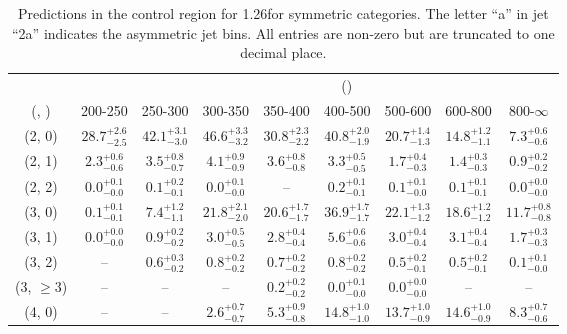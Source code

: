 \begin{table}[h!]
\tiny
\centering
\caption{Predictions in the \mmj control region for 1.26\ifb for symmetric categories. The letter ``a'' in jet \eg ``2a''  indicates the asymmetric jet bins. All entries are non-zero but are truncated to one decimal place.\label{tab:predsep_ewk_mumu_sym}}
\begin{tabular}
{ccccccccc}
	\hline\hline
&	& \multicolumn{8}{c}{\scalht (\gev)} \\ 
	 (\njet,  \nb) & 200-250 & 250-300 & 300-350 & 350-400 & 400-500 & 500-600 & 600-800 & 800-$\infty$ \\ [0.8ex] 
\hline
	(2, 0) & $28.7^{+ 2.6 }_{- 2.5 }$ & $42.1^{+ 3.1 }_{- 3.0 }$ & $46.6^{+ 3.3 }_{- 3.2 }$ & $30.8^{+ 2.3 }_{- 2.2 }$ & $40.8^{+ 2.0 }_{- 1.9 }$ & $20.7^{+ 1.4 }_{- 1.3 }$ & $14.8^{+ 1.2 }_{- 1.1 }$ & $7.3^{+ 0.6 }_{- 0.6 }$ \\[0.5ex] 
	(2, 1) & $2.3^{+ 0.6 }_{- 0.6 }$ & $3.5^{+ 0.8 }_{- 0.7 }$ & $4.1^{+ 0.9 }_{- 0.9 }$ & $3.6^{+ 0.8 }_{- 0.8 }$ & $3.3^{+ 0.5 }_{- 0.5 }$ & $1.7^{+ 0.4 }_{- 0.3 }$ & $1.4^{+ 0.3 }_{- 0.3 }$ & $0.9^{+ 0.2 }_{- 0.2 }$ \\[0.5ex] 
	(2, 2) & $0.0^{+ 0.1 }_{- 0.0 }$ & $0.1^{+ 0.2 }_{- 0.1 }$ & $0.0^{+ 0.1 }_{- 0.0 }$ & -- & $0.2^{+ 0.1 }_{- 0.1 }$ & $0.1^{+ 0.1 }_{- 0.0 }$ & $0.1^{+ 0.1 }_{- 0.1 }$ & $0.0^{+ 0.0 }_{- 0.0 }$ \\[0.5ex] 
	(3, 0) & $0.1^{+ 0.1 }_{- 0.1 }$ & $7.4^{+ 1.2 }_{- 1.1 }$ & $21.8^{+ 2.1 }_{- 2.0 }$ & $20.6^{+ 1.7 }_{- 1.7 }$ & $36.9^{+ 1.7 }_{- 1.7 }$ & $22.1^{+ 1.3 }_{- 1.2 }$ & $18.6^{+ 1.2 }_{- 1.2 }$ & $11.7^{+ 0.8 }_{- 0.8 }$ \\[0.5ex] 
	(3, 1) & $0.0^{+ 0.0 }_{- 0.0 }$ & $0.9^{+ 0.2 }_{- 0.2 }$ & $3.0^{+ 0.5 }_{- 0.5 }$ & $2.8^{+ 0.4 }_{- 0.4 }$ & $5.6^{+ 0.6 }_{- 0.6 }$ & $3.0^{+ 0.4 }_{- 0.4 }$ & $3.1^{+ 0.4 }_{- 0.4 }$ & $1.7^{+ 0.3 }_{- 0.3 }$ \\[0.5ex] 
	(3, 2) & -- & $0.6^{+ 0.3 }_{- 0.2 }$ & $0.8^{+ 0.2 }_{- 0.2 }$ & $0.7^{+ 0.2 }_{- 0.2 }$ & $0.8^{+ 0.2 }_{- 0.2 }$ & $0.5^{+ 0.2 }_{- 0.1 }$ & $0.5^{+ 0.2 }_{- 0.1 }$ & $0.1^{+ 0.1 }_{- 0.0 }$ \\[0.5ex] 
	(3, $\ge3$) & -- & -- & -- & $0.2^{+ 0.2 }_{- 0.2 }$ & $0.0^{+ 0.1 }_{- 0.0 }$ & $0.0^{+ 0.0 }_{- 0.0 }$ & -- & -- \\[0.5ex] 
	(4, 0) & -- & -- & $2.6^{+ 0.7 }_{- 0.7 }$ & $5.3^{+ 0.9 }_{- 0.8 }$ & $14.8^{+ 1.0 }_{- 1.0 }$ & $13.7^{+ 1.0 }_{- 0.9 }$ & $14.6^{+ 1.0 }_{- 0.9 }$ & $8.3^{+ 0.7 }_{- 0.6 }$ \\[0.5ex] 

\end{tabular}
\end{table}
